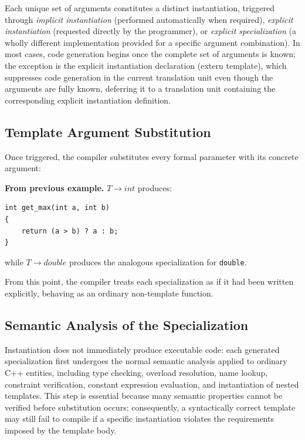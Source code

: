 \documentclass[11pt]{report}
\begin{document}
Each unique set of arguments constitutes a distinct instantiation, triggered through
\emph{implicit instantiation} (performed automatically when required),
\emph{explicit instantiation} (requested directly by the programmer), or
\emph{explicit specialization} (a wholly different implementation provided for a
specific argument combination). In most cases, code generation begins once the complete set of arguments is
known; the exception is the explicit instantiation declaration (extern
template), which suppresses code generation in the current translation unit
even though the arguments are fully known, deferring it to a translation unit
containing the corresponding explicit instantiation definition.


\subsection{Template Argument Substitution}

Once triggered, the compiler substitutes every formal parameter with its concrete
argument:

\begin{examplebox}
\textbf{From previous example.} $T \rightarrow int$ produces:
\begin{lstlisting}
int get_max(int a, int b)
{
    return (a > b) ? a : b;
}
\end{lstlisting}
while $T \rightarrow double$ produces the analogous specialization for
\texttt{double}.
\end{examplebox}

From this point, the compiler treats each specialization as if it had been written
explicitly, behaving as an ordinary non-template function.


\subsection{Semantic Analysis of the Specialization}

Instantiation does not immediately produce executable code: each generated
specialization first undergoes the normal semantic analysis applied to ordinary
C++ entities, including type checking, overload resolution, name lookup,
constraint verification, constant expression evaluation, and instantiation of
nested templates. This step is essential because many semantic properties cannot
be verified before substitution occurs; consequently, a syntactically correct
template may still fail to compile if a specific instantiation violates the
requirements imposed by the template body.
\end{document}
